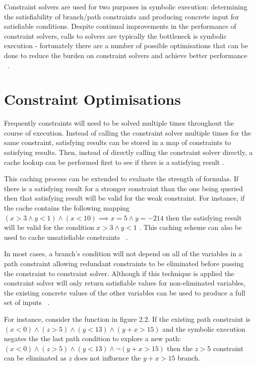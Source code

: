 \documentclass[]{final_report}
\begin{document}
Constraint solvers are used for two purposes in symbolic execution: determining the satisfiability of branch/path constraints and producing concrete input for satisfiable conditions. Despite continual improvements in the performance of constraint solvers, calls to solvers are typically the bottleneck is symbolic execution - fortunately there are a number of possible optimisations that can be done to reduce the burden on constraint solvers and achieve better performance ~\cite{cadar2013symbolic}.


\section{Constraint Optimisations}
Frequently constraints will need to be solved multiple times throughout the course of execution. Instead of calling the constraint solver multiple times for the same constraint, satisfying results can be stored in a map of constraints to satisfying results. Then, instead of directly calling the constraint solver directly, a cache lookup can be performed first to see if there is a satisfying result \cite{cadar2008klee}.

This caching process can be extended to evaluate the strength of formulas. If there is a satisfying result for a stronger constraint than the one being queried then that satisfying result will be valid for the weak constraint. For instance, if the cache contains the following mapping $ (x > 3 \land y <1) \land (x < 10) \implies x = 5 \land y =  -214$ then the satisfying result will be valid for the condition $x > 3 \land y < 1 $ . This caching scheme can also be used to cache unsatisfiable constraints ~\cite{cadar2008klee}.

In most cases, a branch's condition will not depend on all of the variables in a path constraint allowing redundant constraints to be eliminated before passing the constraint to constraint solver. Although if this technique is applied the constraint solver will only return satisfiable values for non-eliminated variables, the existing concrete values of the other variables can be used to produce a full set of inputs ~\cite{cadar2013symbolic}.

For instance, consider the function in figure 2.2. If the existing path constraint is  $(x < 0 ) \land ( z  > 5) \land (y < 13) \land (y + x > 15) $ and the symbolic execution negates the the last path condition to explore a new path:  $ (x < 0) \land (z > 5) \land (y < 13) \land \lnot(y + x > 15)$ then the  $z > 5$ constraint can be eliminated as $z$ does not influence the $y + x > 15$ branch.
\end{document}
